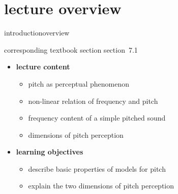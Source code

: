 


\subtitle{module 7.1: human perception of pitch}


	

    \section[overview]{lecture overview}
        \begin{frame}{introduction}{overview}
            \begin{block}{corresponding textbook section}
                    section~7.1
            \end{block}

            \begin{itemize}
                \item   \textbf{lecture content}
                    \begin{itemize}
                        \item   pitch as perceptual phenomenon 
                        \item   non-linear relation of frequency and pitch
                        \item   frequency content of a simple pitched sound
                        \item   dimensions of pitch perception
                    \end{itemize}
                \bigskip
                \item<2->   \textbf{learning objectives}
                    \begin{itemize}
                        \item   describe basic properties of models for pitch
                        \item   explain the two dimensions of pitch perception
                    \end{itemize}
            \end{itemize}
        \end{frame}

